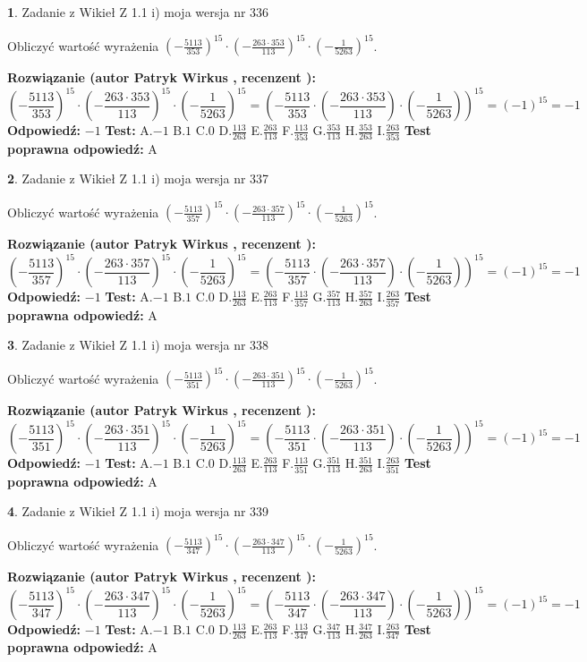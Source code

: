 \documentclass[12pt, a4paper]{article}
\theoremstyle{definition} %
\newtheorem{zad}{}
\newcommand{\zadStart}[1]{\begin{zad}#1\newline}
\newcommand{\zadStop}{\end{zad}}
\newcommand{\rozwStart}[2]{\noindent \textbf{Rozwiązanie (autor #1 , recenzent #2): }\newline}
\newcommand{\rozwStop}{\newline}
\newcommand{\odpStart}{\noindent \textbf{Odpowiedź:}\newline}
\newcommand{\odpStop}{\newline}
\newcommand{\testStart}{\noindent \textbf{Test:}\newline}
\newcommand{\testStop}{\newline}
\newcommand{\kluczStart}{\noindent \textbf{Test poprawna odpowiedź:}\newline}
\newcommand{\kluczStop}{\newline}
\begin{document}
\zadStart{Zadanie z Wikieł Z 1.1 i) moja wersja nr 336}

Obliczyć wartość wyrażenia $(-\frac{5113}{353})^{15} \cdot (-\frac{263 \cdot 353}{113})^{15} \cdot (-\frac{1}{5263})^{15}$.
\zadStop
\rozwStart{Patryk Wirkus}{}
$$(-\frac{5113}{353})^{15} \cdot (-\frac{263 \cdot 353}{113})^{15} \cdot (-\frac{1}{5263})^{15} = (-\frac{5113}{353} \cdot (-\frac{263 \cdot 353}{113}) \cdot (-\frac{1}{5263}))^{15} = (-1)^{15} = -1$$
\rozwStop
\odpStart
$-1$
\odpStop
\testStart
A.$-1$ B.$1$ C.$0$ D.$\frac{113}{263}$ E.$\frac{263}{113}$
F.$\frac{113}{353}$ G.$\frac{353}{113}$
H.$\frac{353}{263}$
I.$\frac{263}{353}$
\testStop
\kluczStart
A
\kluczStop



\zadStart{Zadanie z Wikieł Z 1.1 i) moja wersja nr 337}

Obliczyć wartość wyrażenia $(-\frac{5113}{357})^{15} \cdot (-\frac{263 \cdot 357}{113})^{15} \cdot (-\frac{1}{5263})^{15}$.
\zadStop
\rozwStart{Patryk Wirkus}{}
$$(-\frac{5113}{357})^{15} \cdot (-\frac{263 \cdot 357}{113})^{15} \cdot (-\frac{1}{5263})^{15} = (-\frac{5113}{357} \cdot (-\frac{263 \cdot 357}{113}) \cdot (-\frac{1}{5263}))^{15} = (-1)^{15} = -1$$
\rozwStop
\odpStart
$-1$
\odpStop
\testStart
A.$-1$ B.$1$ C.$0$ D.$\frac{113}{263}$ E.$\frac{263}{113}$
F.$\frac{113}{357}$ G.$\frac{357}{113}$
H.$\frac{357}{263}$
I.$\frac{263}{357}$
\testStop
\kluczStart
A
\kluczStop



\zadStart{Zadanie z Wikieł Z 1.1 i) moja wersja nr 338}

Obliczyć wartość wyrażenia $(-\frac{5113}{351})^{15} \cdot (-\frac{263 \cdot 351}{113})^{15} \cdot (-\frac{1}{5263})^{15}$.
\zadStop
\rozwStart{Patryk Wirkus}{}
$$(-\frac{5113}{351})^{15} \cdot (-\frac{263 \cdot 351}{113})^{15} \cdot (-\frac{1}{5263})^{15} = (-\frac{5113}{351} \cdot (-\frac{263 \cdot 351}{113}) \cdot (-\frac{1}{5263}))^{15} = (-1)^{15} = -1$$
\rozwStop
\odpStart
$-1$
\odpStop
\testStart
A.$-1$ B.$1$ C.$0$ D.$\frac{113}{263}$ E.$\frac{263}{113}$
F.$\frac{113}{351}$ G.$\frac{351}{113}$
H.$\frac{351}{263}$
I.$\frac{263}{351}$
\testStop
\kluczStart
A
\kluczStop



\zadStart{Zadanie z Wikieł Z 1.1 i) moja wersja nr 339}

Obliczyć wartość wyrażenia $(-\frac{5113}{347})^{15} \cdot (-\frac{263 \cdot 347}{113})^{15} \cdot (-\frac{1}{5263})^{15}$.
\zadStop
\rozwStart{Patryk Wirkus}{}
$$(-\frac{5113}{347})^{15} \cdot (-\frac{263 \cdot 347}{113})^{15} \cdot (-\frac{1}{5263})^{15} = (-\frac{5113}{347} \cdot (-\frac{263 \cdot 347}{113}) \cdot (-\frac{1}{5263}))^{15} = (-1)^{15} = -1$$
\rozwStop
\odpStart
$-1$
\odpStop
\testStart
A.$-1$ B.$1$ C.$0$ D.$\frac{113}{263}$ E.$\frac{263}{113}$
F.$\frac{113}{347}$ G.$\frac{347}{113}$
H.$\frac{347}{263}$
I.$\frac{263}{347}$
\testStop
\kluczStart
A
\kluczStop
\end{document}
